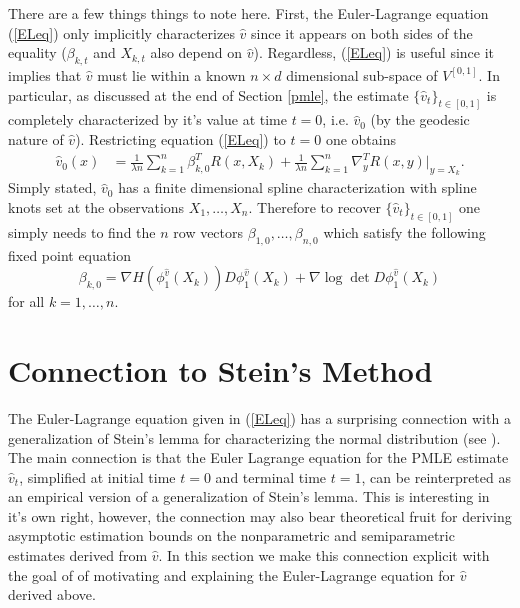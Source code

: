 \documentclass[noinfoline]{imsart}
\begin{document}
   There are a few things things to note here. First, the Euler-Lagrange equation  (\ref{ELeq}) only implicitly characterizes $\hat v$ since it appears on both sides of the equality ($\beta_{k,t}$ and $X_{k,t}$ also  depend on $\hat v$). Regardless,  (\ref{ELeq}) is useful since it implies that $\hat v$ must lie within a known $n\times d$ dimensional sub-space of $V^{[0,1]}$. In particular, as discussed at the end of Section \ref{pmle}, the estimate $\{ \hat v_t\}_{t\in [0,1]}$ is completely characterized by it's value at time $t=0$, i.e.\! $\hat v_0$ (by the geodesic nature of $\hat v$). Restricting equation (\ref{ELeq}) to  $t=0$ one obtains
   \begin{align}
 \label{ELeq0}
 \hat v_0(x)&=  \frac{1}{\lambda n}\sum_{k=1}^n \beta^T_{k,0} R(x,X_{k})  +  \frac{1}{\lambda n}\sum_{k=1}^n   \nabla_{y}^T R(x,y)\Bigr|_{y= X_{k}}.
\end{align}
  Simply stated, $\hat v_0$ has a finite dimensional spline characterization with spline knots set at the observations $X_1,\ldots, X_n$. Therefore to recover $\{ \hat v_t \}_{t\in[0,1]}$ one simply needs to find the $n$ row vectors $\beta_{1,0},\dots, \beta_{n,0}$ which satisfy the following fixed point equation
        \begin{equation}
 \label{InitialMom}
  \beta_{k,0}= \nabla H(\phi^{\hat v}_1(X_k))  D\phi^{\hat v}_{1}(X_k)+ \nabla \log\det D\phi^{\hat v}_{1} (X_k)
  \end{equation}
 for all $k=1,\ldots,n$.



\section{Connection to Stein's Method}
\label{steinSection}

The Euler-Lagrange equation given in (\ref{ELeq}) has a surprising connection with a generalization of Stein's lemma for characterizing the normal distribution (see \cite{stein:04}). The main connection is that the Euler Lagrange equation for the PMLE estimate $\hat v_t$, simplified at initial time $t=0$ and terminal time $t=1$, can be reinterpreted as an empirical version of a generalization of Stein's lemma. This is interesting in it's own right, however, the connection may also bear theoretical fruit for deriving asymptotic estimation bounds on the nonparametric and semiparametric estimates derived from $\hat v$. In this section we make this connection explicit  with the goal of of motivating and explaining the Euler-Lagrange equation for $\hat v$ derived above.
\end{document}
